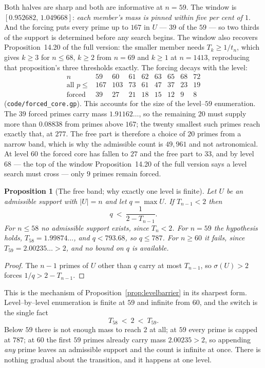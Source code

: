 \documentclass[11pt]{article}
\newtheorem{proposition}[theorem]{Proposition}
\theoremstyle{definition}
\begin{document}
Both halves are sharp and both are informative at $n=59$. The window is
$[0.952682,\,1.049668]$: \emph{each member's mass is pinned within five per cent of $1$}. And the
forcing puts every prime up to $167$ in $U$ --- $39$ of the $59$ --- so two thirds of the support is
determined before any search begins. The window also recovers
Proposition~14.20 of the full version: the smaller member needs $T_k\ge1/t_n$, which gives $k\ge3$ for
$n\le68$, $k\ge2$ from $n=69$ and $k\ge1$ at $n=1413$, reproducing that proposition's three
thresholds exactly. The forcing decays with the level:
\[
\begin{array}{l|cccccccc}
n & 59 & 60 & 61 & 62 & 63 & 65 & 68 & 72\\\hline
\text{all }p\le & 167 & 103 & 73 & 61 & 47 & 37 & 23 & 19\\
\text{forced} & 39 & 27 & 21 & 18 & 15 & 12 & 9 & 8
\end{array}
\]
\textup{(\texttt{code/forced\_core.gp})}. This accounts for the size of the level--$59$ enumeration.
The $39$ forced primes carry mass $1.91162\ldots$, so the remaining $20$ must supply more than
$0.08838$ from primes above $167$; the twenty smallest such primes reach exactly that, at $277$. The
free part is therefore a choice of $20$ primes from a narrow band, which is why the admissible count
is $49{,}961$ and not astronomical. At level $60$ the forced core has fallen to $27$ and the free
part to $33$, and by level $68$ --- the top of the window Proposition~14.20 of the full version says a level
search must cross --- only $9$ primes remain forced.

\begin{proposition}[The free band; why exactly one level is finite]\label{prop:band}
Let $U$ be an admissible support with $|U|=n$ and let $q=\max U$. If $T_{n-1}<2$ then
\[ q\ <\ \frac1{2-T_{n-1}}. \]
For $n\le58$ no admissible support exists, since $T_n<2$. For $n=59$ the hypothesis holds,
$T_{58}=1.99874\ldots$, and $q<793.68$, so $q\le787$. For $n\ge60$ it fails, since
$T_{59}=2.00235\ldots>2$, and no bound on $q$ is available.
\end{proposition}
\begin{proof}
The $n-1$ primes of $U$ other than $q$ carry at most $T_{n-1}$, so $\sigma(U)>2$ forces
$1/q>2-T_{n-1}$.
\end{proof}

This is the mechanism of Proposition~\ref{prop:levelbarrier} in its sharpest form. Level--by--level
enumeration is finite at $59$ and infinite from $60$, and the switch is the single fact
\[ T_{58}\ <\ 2\ <\ T_{59}. \]
Below $59$ there is not enough mass to reach $2$ at all; at $59$ every prime is capped at $787$; at
$60$ the first $59$ primes already carry mass $2.00235>2$, so appending \emph{any} prime leaves an
admissible support and the count is infinite at once. There is nothing gradual about the transition,
and it happens at one level.
\end{document}
